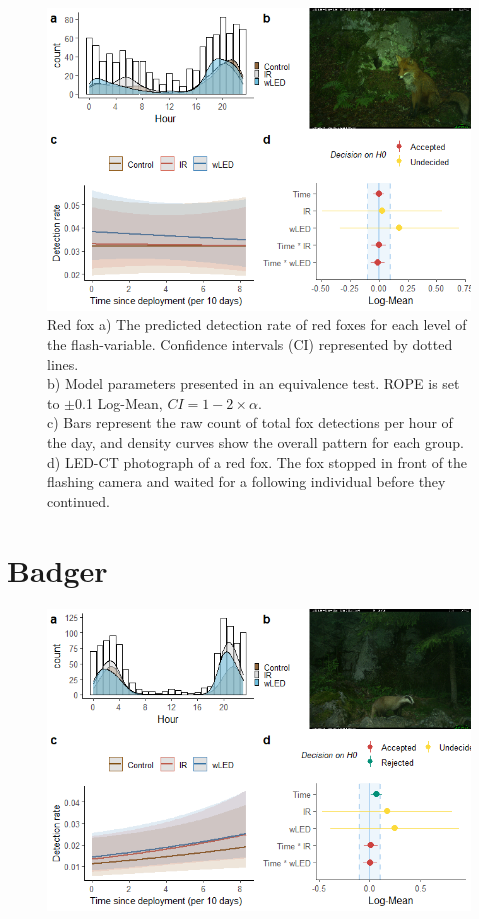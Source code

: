\begin{table}[ht]
\begin{figure}
		  \centering
	\includegraphics[scale=.9]{../R/glmm_sp_files/figure-html/rev2-1.png}
\caption[Red fox]
{Red fox %
a) The predicted detection rate of red foxes for each level of the flash-variable. Confidence intervals (CI) represented by dotted lines.\\ 
b) Model parameters presented in an equivalence test. ROPE is set to $\pm$0.1 Log-Mean, $CI =1 - 2\times \alpha$.\\ 
c) Bars represent the raw count of total fox detections per hour of the day, and density curves show the overall pattern for each group.\\
d) LED-CT photograph of a red fox. The fox stopped in front of the flashing camera and waited for a following individual before they continued.}\label{fig:rev}
\end{figure}


\newpage
\section{Badger}


\begin{figure}
		  \centering
	\includegraphics[scale=.9]{../R/glmm_sp_files/figure-html/grevling2-1.png}


\end{figure}
\end{table}
